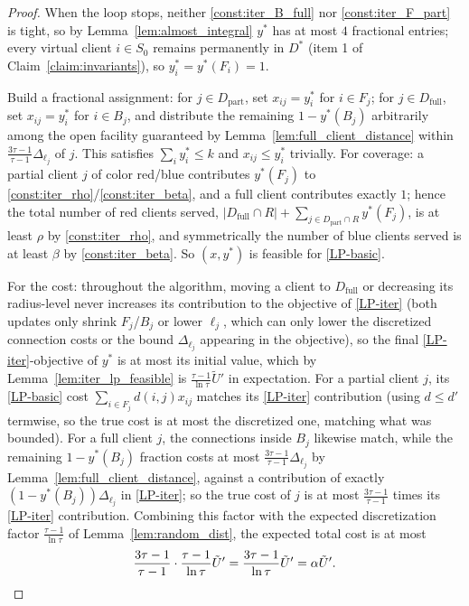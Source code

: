 \documentclass[a4paper,11pt]{article}
\begin{document}
\begin{proof}
When the loop stops, neither \eqref{const:iter_B_full} nor
\eqref{const:iter_F_part} is tight, so by Lemma~\ref{lem:almost_integral}
$y^*$ has at most $4$ fractional entries; every virtual client $i\in S_0$
remains permanently in $D^*$ (item 1 of Claim~\ref{claim:invariants}), so
$y^*_i=y^*(F_i)=1$.

Build a fractional assignment: for $j\in D_\text{part}$, set
$x_{ij}=y^*_i$ for $i\in F_j$; for $j\in D_\text{full}$, set $x_{ij}=y^*_i$
for $i\in B_j$, and distribute the remaining $1-y^*(B_j)$ arbitrarily
among the open facility guaranteed by Lemma~\ref{lem:full_client_distance}
within $\frac{3\tau-1}{\tau-1}\Delta_{\ell_j}$ of $j$. This satisfies
$\sum_i y^*_i\le k$ and $x_{ij}\le y^*_i$ trivially. For coverage: a
partial client $j$ of color red/blue contributes $y^*(F_j)$ to
\eqref{const:iter_rho}/\eqref{const:iter_beta}, and a full client
contributes exactly $1$; hence the total number of red clients served,
$|D_\text{full}\cap R|+\sum_{j\in D_\text{part}\cap R} y^*(F_j)$, is at
least $\rho$ by \eqref{const:iter_rho}, and symmetrically the number of
blue clients served is at least $\beta$ by \eqref{const:iter_beta}. So
$(x,y^*)$ is feasible for \eqref{LP-basic}.

For the cost: throughout the algorithm, moving a client to
$D_\text{full}$ or decreasing its radius-level never increases its
contribution to the objective of \eqref{LP-iter} (both updates only
shrink $F_j$/$B_j$ or lower $\ell_j$, which can only lower the discretized
connection costs or the bound $\Delta_{\ell_j}$ appearing in the
objective), so the final \eqref{LP-iter}-objective of $y^*$ is at most
its initial value, which by Lemma~\ref{lem:iter_lp_feasible} is
$\frac{\tau-1}{\ln\tau}\tilde U'$ in expectation. For a partial client
$j$, its \eqref{LP-basic} cost $\sum_{i\in F_j}d(i,j)x_{ij}$ matches its
\eqref{LP-iter} contribution (using $d\le d'$ termwise, so the true cost
is at most the discretized one, matching what was bounded). For a full
client $j$, the connections inside $B_j$ likewise match, while the
remaining $1-y^*(B_j)$ fraction costs at most
$\frac{3\tau-1}{\tau-1}\Delta_{\ell_j}$ by
Lemma~\ref{lem:full_client_distance}, against a contribution of exactly
$(1-y^*(B_j))\Delta_{\ell_j}$ in \eqref{LP-iter}; so the true cost of $j$
is at most $\frac{3\tau-1}{\tau-1}$ times its \eqref{LP-iter}
contribution. Combining this factor with the expected discretization
factor $\frac{\tau-1}{\ln\tau}$ of Lemma~\ref{lem:random_dist}, the
expected total cost is at most
\[
\frac{3\tau-1}{\tau-1}\cdot\frac{\tau-1}{\ln\tau}\tilde U' =
\frac{3\tau-1}{\ln\tau}\tilde U' = \alpha\tilde U'. \qedhere
\]
\end{proof}
\end{document}
